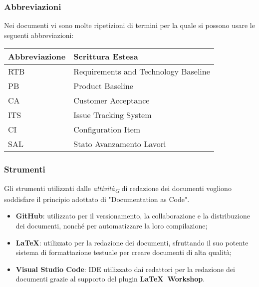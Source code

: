 \subsubsection{Abbreviazioni}
Nei documenti vi sono molte ripetizioni di termini per la quale si possono usare le seguenti abbreviazioni:\\
\vspace{0.2cm}
\begin{center}
    \begin{tabular}{|C{2.5cm}|C{5cm}|}
        \hline
        \textbf{Abbreviazione} & \textbf{Scrittura Estesa}            \\
        \hline
        RTB                    & Requirements and Technology Baseline \\
        PB                     & Product Baseline                     \\
        CA                     & Customer Acceptance                  \\
        ITS                    & Issue Tracking System                \\
        CI                     & Configuration Item                   \\
        SAL                    & Stato Avanzamento Lavori             \\   
        \hline
    \end{tabular}
\end{center}
    
\subsubsection{Strumenti}
Gli strumenti utilizzati dalle \textit{attività}\textsubscript{\textit{G}} di redazione dei documenti vogliono soddisfare il principio adottato di "Documentation as Code".
\begin{itemize}
    \item \textbf{GitHub}: utilizzato per il versionamento, la collaborazione e la distribuzione dei documenti, nonché per automatizzare la loro compilazione;
    \item \textbf{\LaTeX}: utilizzato per la redazione dei documenti, sfruttando il suo potente sistema di formattazione testuale per creare documenti di alta qualità;
    \item \textbf{Visual Studio Code}: IDE utilizzato dai redattori per la redazione dei documenti grazie al supporto del plugin \textbf{\LaTeX\ Workshop}.
\end{itemize}
